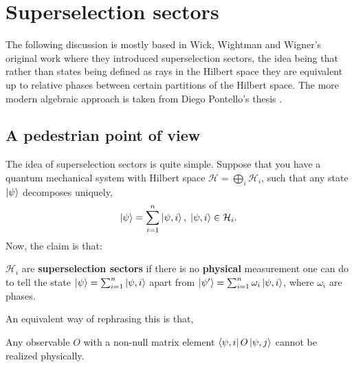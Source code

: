 
\chapter{Superselection sectors}


The following discussion is mostly based in Wick, 
Wightman and Wigner's original work \cite{Wick1952sectors} where they 
introduced superselection sectors, the idea being that rather than 
states being defined as rays in the Hilbert space they are equivalent
up to relative phases between certain partitions of the Hilbert space. 
The more modern algebraic approach is taken from Diego Pontello's thesis \cite{pontello2019entanglement}. 


\section{A pedestrian point of view}
The idea of superselection sectors is quite simple. 
Suppose that you have a quantum mechanical system with Hilbert space
$\mathcal{H}=\bigoplus_i \mathcal{H}_i$, such that any state 
$\ket{\psi}$ decomposes uniquely,
\begin{equation*}
    \ket{\psi}=\sum_{i=1}^{n}\ket{\psi,i}, \; \ket{\psi,i} \in \mathcal{H}_i.
\end{equation*}
Now, the claim is that:
\begin{center}
\itshape
\parbox{0.75\textwidth}{
\centering
$\mathcal{H}_i$ are \textbf{superselection sectors} if there is no
\textbf{physical} measurement one can do to tell the state
$\ket{\psi}=\sum_{i=1}^{n} \ket{\psi,i}$ apart from
$\ket{\psi'}=\sum_{i=1}^{n} \omega_i \ket{\psi,i}$,
where $\omega_i$ are phases.\par
}
\end{center}

An equivalent way of rephrasing this is that,

\begin{center}
\itshape
\parbox{0.75\textwidth}{
    \centering
    Any observable $O$ with a non-null matrix element
    $\bra{\psi,i} O \ket{\psi,j}$ cannot be realized
    physically\footnotemark.
}
\end{center}


